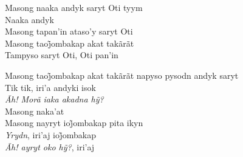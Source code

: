 \bigskip

\begin{linenumbers}\begingroup\raggedright
 
\noindent  Masong naaka andyk saryt Oti tyym\\
 Naaka andyk\\
 Masong tapan'in ataso'y saryt Oti\\
 Masong taoj̃ombakap akat takãrãt\\
 Tampyso saryt Oti, Oti pan'in

\end{linenumbers}\endgroup

\bigskip

\begin{linenumbers}\begingroup\raggedright

\noindent  Masong taoj̃ombakap akat takãrãt napyso pysodn andyk saryt\\
 Tik tik, iri'a andyki isok\\
 \emph{Ãh! Morã iaka akadna hỹ?}\\
 Masong naka'at\\
 Masong nayryt ioj̃ombakap pita ikyn\\
 \emph{Yrydn}, iri’aj ioj̃ombakap\\
 \emph{Ãh! ayryt oko hỹ?}, iri’aj

\end{linenumbers}\endgroup

\bigskip

